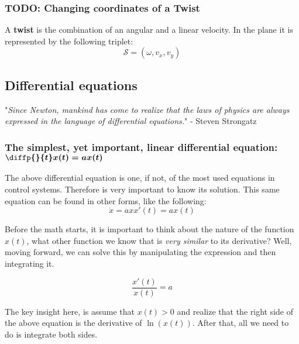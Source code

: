 \documentclass[12pt]{article}
\begin{document}
\color{blue}
\subsubsection{TODO: Changing coordinates of a Twist}
A \textbf{twist} is the combination of an angular and a linear velocity. In the plane it is represented by the following triplet:
\begin{equation}
    \mathcal{S} = (\omega, v_x, v_y)
    \label{eq:twist2d}
\end{equation}
\color{black}

\subsection{Differential equations}
"\textit{Since Newton, mankind has come to realize that the laws of physics are always expressed in the language of differential equations.}" - Steven Strongatz

\subsubsection{The simplest, yet important, linear differential equation: $\boldsymbol{\protect\diffp{}{t} x(t) = a x(t)}$ }
The above differential equation is one, if not, of the most used equations in control systems. Therefore is very important to know its solution. This same equation can be found in other forms, like the following:
\begin{subequations}
    \begin{equation}
        \dot{x} = ax
    \end{equation} 
    \begin{equation}
        x'(t) = a x(t)
    \end{equation}
    \label{eq:simplest-edo}
\end{subequations}

Before the math starts, it is important to think about the nature of the function $x(t)$, what other function we know that is \textit{very similar} to its derivative? Well, moving forward, we can solve this by manipulating the expression and then integrating it.

\begin{equation*}
    \frac{x'(t)}{x(t)} = a 
\end{equation*}

The key insight here, is assume that $x(t) > 0$ and realize that the right side of the above equation is the derivative of $\ln({x(t)})$. After that, all we need to do is integrate both sides.
\end{document}
